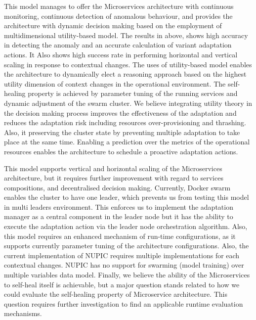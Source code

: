 \documentclass{ieeeaccess}
\begin{document}
This model manages to offer the Microservices architecture with continuous monitoring, continuous detection of anomalous behaviour, and provides the architecture with dynamic decision making based on the employment of multidimensional utility-based model. The results in above, shows high accuracy in detecting the anomaly and an accurate calculation of variant adaptation actions. It Also shows high success rate in performing horizontal and vertical scaling in response to contextual changes. The uses of  utility-based model enables the architecture to dynamically elect a reasoning approach based on the highest utility dimension of context changes in the operational environment. The self-healing property is achieved by parameter tuning of the running services and dynamic adjustment of the swarm cluster. We believe integrating utility theory in the decision making process improves the effectiveness of the adaptation and reduces the adaptation risk including resources over-provisioning and thrashing. Also, it preserving the cluster state by preventing multiple adaptation to take place at the same time. Enabling a prediction over the metrics of the operational resources enables the architecture to schedule a proactive adaptation actions. 

This model supports vertical and horizontal scaling of the Microservices architecture, but it requires further improvement with regard to services compositions, and decentralised decision making. Currently, Docker swarm enables the cluster to have one leader, which prevents us from testing this model in multi leaders environment. This enforces us to implement the adaptation manager as a central component in the leader node but it has the ability to  execute the adaptation action via the leader node orchestration algorithm. Also, this model requires an enhanced mechanism of run-time configurations, as it supports currently parameter tuning of the architecture configurations. Also, the current implementation of NUPIC requires multiple implementations for each contextual changes. NUPIC has no support for swarming (model training) over multiple variables data model. Finally, we believe the ability of the Microservices to self-heal itself is achievable, but a major question stands related to how we could evaluate the self-healing property of Microservice architecture. This question requires further investigation to find an applicable runtime evaluation mechanisms.    

 
 \EOD
\end{document}
